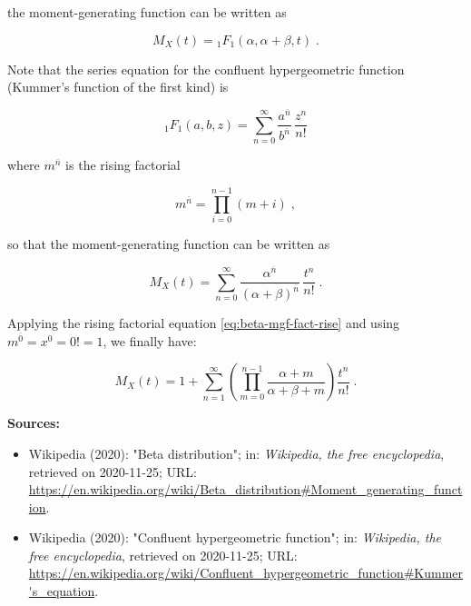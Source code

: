 \documentclass[a4paper,12pt,twoside]{book}
\begin{document}
the moment-generating function can be written as

\begin{equation} \label{eq:beta-mgf-beta-mgf-s2}
M_X(t) = {}_1 F_1(\alpha,\alpha+\beta,t) \; .
\end{equation}

Note that the series equation for the confluent hypergeometric function (Kummer's function of the first kind) is

\begin{equation} \label{eq:beta-mgf-con-hyp-geo-fct-ser}
{}_1 F_1(a,b,z) = \sum_{n=0}^{\infty} \frac{a^{\overline{n}}}{b^{\overline{n}}} \, \frac{z^n}{n!}
\end{equation}

where $m^{\overline{n}}$ is the rising factorial

\begin{equation} \label{eq:beta-mgf-fact-rise}
m^{\overline{n}} = \prod_{i=0}^{n-1} (m+i) \; ,
\end{equation}

so that the moment-generating function can be written as

\begin{equation} \label{eq:beta-mgf-beta-mgf-s3}
M_X(t) = \sum_{n=0}^{\infty} \frac{\alpha^{\overline{n}}}{(\alpha+\beta)^{\overline{n}}} \, \frac{t^n}{n!} \; .
\end{equation}

Applying the rising factorial equation \eqref{eq:beta-mgf-fact-rise} and using $m^{\overline{0}} = x^0 = 0! = 1$, we finally have:

\begin{equation} \label{eq:beta-mgf-beta-mgf-s4}
M_X(t) = 1 + \sum_{n=1}^{\infty} \left( \prod_{m=0}^{n-1} \frac{\alpha + m}{\alpha + \beta + m} \right) \frac{t^n}{n!} \; .
\end{equation}


\vspace{1em}
\textbf{Sources:}
\begin{itemize}
\item Wikipedia (2020): "Beta distribution"; in: \textit{Wikipedia, the free encyclopedia}, retrieved on 2020-11-25; URL: \url{https://en.wikipedia.org/wiki/Beta_distribution#Moment_generating_function}.
\item Wikipedia (2020): "Confluent hypergeometric function"; in: \textit{Wikipedia, the free encyclopedia}, retrieved on 2020-11-25; URL: \url{https://en.wikipedia.org/wiki/Confluent_hypergeometric_function#Kummer's_equation}.
\end{itemize}
\end{document}
